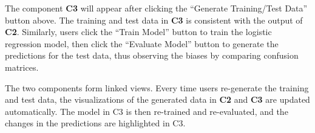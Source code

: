 \begin{VCSet}
    \begin{visualComponent}
    \end{visualComponent}

    The component \textbf{C3} will appear after clicking the “Generate Training/Test Data” button above. The training and test data in \textbf{C3} is consistent with the output of \textbf{C2}. 
    Similarly, users click the “Train Model” button to train the logistic regression model, then click the “Evaluate Model” button to generate the predictions for the test data, thus observing the biases by comparing confusion matrices.

    \begin{visualComponent}
    \end{visualComponent}
\end{VCSet}

The two components form linked views. Every time users re-generate the training and test data, the visualizations of the generated data in \textbf{C2} and \textbf{C3} are updated automatically. The model in C3 is then re-trained and re-evaluated, and the changes in the predictions are highlighted in C3.



